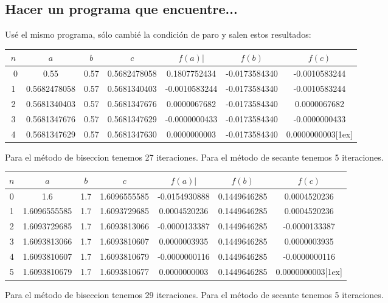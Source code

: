 \documentclass{article}
\begin{document}
\subsection{Hacer un programa que encuentre...}
Usé el mismo programa, sólo cambié la condición de paro y salen estos resultados:

\begin{center}
    \begin{tabular}{||c c c c c c c||} 
    \hline
    $n$ & $a$ & $b$  & $c$ & $f(a)|$ & $f(b)$ & $f(c)$ \\ [0.5ex] 
    \hline\
    0 & 0.55 & 0.57 & 0.5682478058  & 0.1807752434 &  -0.0173584340 & -0.0010583244\\ 
    \hline
    1 & 0.5682478058 & 0.57  & 0.5681340403  & -0.0010583244 & -0.0173584340 &  -0.0010583244 \\
    \hline
    2 & 0.5681340403 & 0.57  & 0.5681347676   & 0.0000067682& -0.0173584340  &  0.0000067682\\
    \hline
    3 & 0.5681347676  & 0.57  & 0.5681347629 &  -0.0000000433 &  -0.0173584340 & -0.0000000433\\
    \hline
    4 & 0.5681347629 & 0.57  & 0.5681347630 & 0.0000000003 &  -0.0173584340  & 0.0000000003[1ex]

   \end{tabular}
\end{center}

Para el método de biseccion tenemos 27 iteraciones.
Para el método de secante tenemos 5 iteraciones.

\begin{center}
    \begin{tabular}{||c c c c c c c||} 
    \hline
    $n$ & $a$ & $b$  & $c$ & $f(a)|$ & $f(b)$ & $f(c)$ \\ [0.5ex] 
    \hline\hline
    0 & 1.6 & 1.7 & 1.6096555585 & -0.0154930888 &  0.1449646285 & 0.0004520236\\ 
    \hline
    1 & 1.6096555585& 1.7  & 1.6093729685 & 0.0004520236 & 0.1449646285&  0.0004520236 \\
    \hline
    2 & 1.6093729685 & 1.7  & 1.6093813066  & -0.0000133387 & 0.1449646285  &  -0.0000133387\\
    \hline
    3 & 1.6093813066  & 1.7  & 1.6093810607 & 0.0000003935  &  0.1449646285 & 0.0000003935\\
    \hline
    4 & 1.6093810607 & 1.7  & 1.6093810679 & -0.0000000116 &  0.1449646285  & -0.0000000116\\
    \hline
    5 & 1.6093810679 & 1.7  & 1.6093810677 & 0.0000000003 &  0.1449646285  & 0.0000000003[1ex]

   \end{tabular}
\end{center}

Para el método de biseccion tenemos 29 iteraciones.
Para el método de secante tenemos 5 iteraciones.
\end{document}
